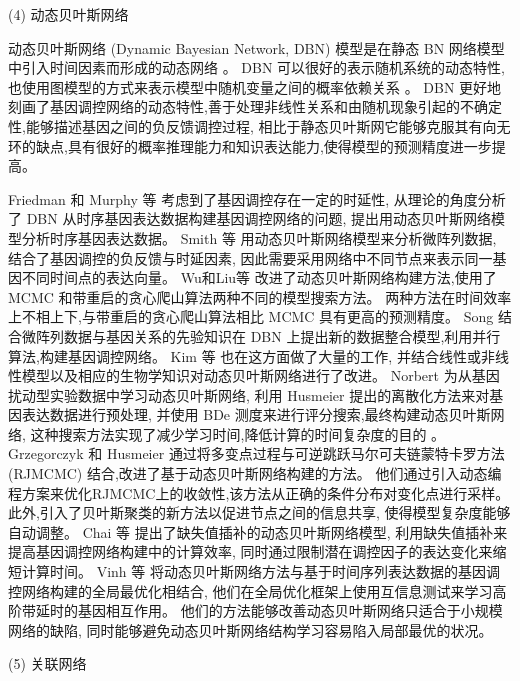 (4) 动态贝叶斯网络

动态贝叶斯网络 (Dynamic Bayesian Network, DBN) 模型是在静态 BN 网络模型中引入时间因素而形成的动态网络 \cite{dondelinger2010heterogeneous,grzegorczyk2010improvements}。
DBN 可以很好的表示随机系统的动态特性,也使用图模型的方式来表示模型中随机变量之间的概率依赖关系 \cite{hecker2009gene}。
DBN 更好地刻画了基因调控网络的动态特性,善于处理非线性关系和由随机现象引起的不确定性,能够描述基因之间的负反馈调控过程,
相比于静态贝叶斯网它能够克服其有向无环的缺点,具有很好的概率推理能力和知识表达能力,使得模型的预测精度进一步提高。

Friedman 和 Murphy 等 \cite{friedman2004inferring} 考虑到了基因调控存在一定的时延性,
从理论的角度分析了 DBN 从时序基因表达数据构建基因调控网络的问题, 提出用动态贝叶斯网络模型分析时序基因表达数据。
Smith 等 \cite{smith2006computational} 用动态贝叶斯网络模型来分析微阵列数据,
结合了基因调控的负反馈与时延因素, 因此需要采用网络中不同节点来表示同一基因不同时间点的表达向量。
Wu和Liu等 \cite{wu2008dynamic} 改进了动态贝叶斯网络构建方法,使用了 MCMC 和带重启的贪心爬山算法两种不同的模型搜索方法。 
两种方法在时间效率上不相上下,与带重启的贪心爬山算法相比 MCMC 具有更高的预测精度。
Song \cite{song2009keller}结合微阵列数据与基因关系的先验知识在 DBN 上提出新的数据整合模型,利用并行算法,构建基因调控网络。
Kim 等 \cite{del2010efficient} 也在这方面做了大量的工作,
并结合线性或非线性模型以及相应的生物学知识对动态贝叶斯网络进行了改进。
Norbert \cite{netrapalli2010greedy} 为从基因扰动型实验数据中学习动态贝叶斯网络,
利用 Husmeier \cite{werhli2006comparative} 提出的离散化方法来对基因表达数据进行预处理,
并使用 BDe 测度来进行评分搜索,最终构建动态贝叶斯网络, 这种搜索方法实现了减少学习时间,降低计算的时间复杂度的目的 \cite{hurley2011gene}。
Grzegorczyk 和 Husmeier \cite{grzegorczyk2010improvements} 通过将多变点过程与可逆跳跃马尔可夫链蒙特卡罗方法 (RJMCMC) 结合,改进了基于动态贝叶斯网络构建的方法。 他们通过引入动态编程方案来优化RJMCMC上的收敛性,该方法从正确的条件分布对变化点进行采样。 
此外,引入了贝叶斯聚类的新方法以促进节点之间的信息共享, 使得模型复杂度能够自动调整。
Chai 等 \cite{chai2012inferring} 提出了缺失值插补的动态贝叶斯网络模型,
利用缺失值插补来提高基因调控网络构建中的计算效率,
同时通过限制潜在调控因子的表达变化来缩短计算时间。
Vinh 等 \cite{vinh2012gene} 将动态贝叶斯网络方法与基于时间序列表达数据的基因调控网络构建的全局最优化相结合,
他们在全局优化框架上使用互信息测试来学习高阶带延时的基因相互作用。
他们的方法能够改善动态贝叶斯网络只适合于小规模网络的缺陷,
同时能够避免动态贝叶斯网络结构学习容易陷入局部最优的状况。

(5) 关联网络


